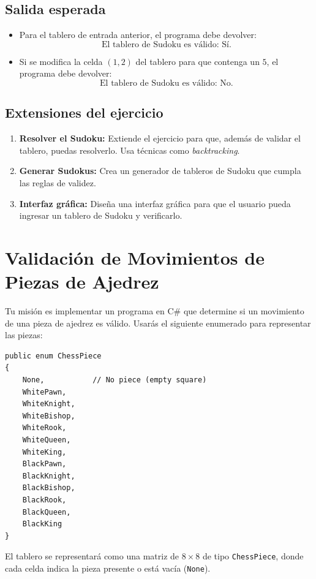 \subsection*{Salida esperada}

\begin{itemize}
    \item Para el tablero de entrada anterior, el programa debe devolver:
    \[
    \text{El tablero de Sudoku es válido: Sí.}
    \]
    \item Si se modifica la celda \((1,2)\) del tablero para que contenga un \(5\), el programa debe devolver:
    \[
    \text{El tablero de Sudoku es válido: No.}
    \]
\end{itemize}

\subsection*{Extensiones del ejercicio}
\begin{enumerate}
    \item \textbf{Resolver el Sudoku:} Extiende el ejercicio para que, además de validar el tablero, puedas resolverlo. Usa técnicas como \textit{backtracking}.
    \item \textbf{Generar Sudokus:} Crea un generador de tableros de Sudoku que cumpla las reglas de validez.
    \item \textbf{Interfaz gráfica:} Diseña una interfaz gráfica para que el usuario pueda ingresar un tablero de Sudoku y verificarlo.
\end{enumerate}

\section{Validación de Movimientos de Piezas de Ajedrez}

Tu misión es implementar un programa en C\# que determine si un movimiento de una pieza de ajedrez es válido. Usarás el siguiente enumerado para representar las piezas:

\begin{lstlisting}[caption=Enumeración para las piezas de ajedrez]
public enum ChessPiece
{
    None,           // No piece (empty square)
    WhitePawn,
    WhiteKnight,
    WhiteBishop,
    WhiteRook,
    WhiteQueen,
    WhiteKing,
    BlackPawn,
    BlackKnight,
    BlackBishop,
    BlackRook,
    BlackQueen,
    BlackKing
}
\end{lstlisting}

El tablero se representará como una matriz de \(8 \times 8\) de tipo \texttt{ChessPiece}, donde cada celda indica la pieza presente o está vacía (\texttt{None}).

